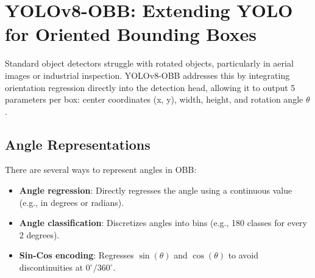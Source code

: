 



\section*{YOLOv8-OBB: Extending YOLO for Oriented Bounding Boxes}
Standard object detectors struggle with rotated objects, particularly in aerial images or industrial inspection. YOLOv8-OBB addresses this by integrating orientation regression directly into the detection head, allowing it to output 5 parameters per box: center coordinates (x, y), width, height, and rotation angle $\theta$.

\subsection*{Angle Representations}
There are several ways to represent angles in OBB:

\begin{itemize}
    \item \textbf{Angle regression}: Directly regresses the angle using a continuous value (e.g., in degrees or radians).
    \item \textbf{Angle classification}: Discretizes angles into bins (e.g., 180 classes for every 2 degrees).
    \item \textbf{Sin-Cos encoding}: Regresses $\sin(\theta)$ and $\cos(\theta)$ to avoid discontinuities at $0^\circ/360^\circ$.
\end{itemize}

